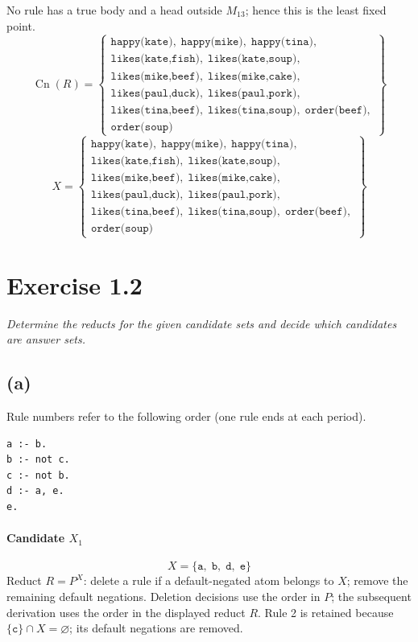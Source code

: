 \documentclass[a4paper,11pt]{article}
\newif\ifexplain
\newcommand{\explain}[1]{\ifexplain\begin{erklbox}#1\end{erklbox}\fi}
\newcommand{\angabe}[1]{\textit{#1}\par}
\newcommand{\aufgabe}[1]{\section*{Exercise #1}}
\newcommand{\teil}[1]{\subsection*{(#1)}}
\newcommand{\at}[1]{\texttt{#1}}
\begin{document}
No rule has a true body and a head outside $M_{13}$; hence this is the least fixed point.
\[
\operatorname{Cn}(R)=\left\{\begin{gathered}\at{happy(kate)},\;\at{happy(mike)},\;\at{happy(tina)},\\\at{likes(kate,fish)},\;\at{likes(kate,soup)},\\\at{likes(mike,beef)},\;\at{likes(mike,cake)},\\\at{likes(paul,duck)},\;\at{likes(paul,pork)},\\\at{likes(tina,beef)},\;\at{likes(tina,soup)},\;\at{order(beef)},\\\at{order(soup)}\end{gathered}\right\}
\]
\[
\boxed{X=\left\{\begin{gathered}\at{happy(kate)},\;\at{happy(mike)},\;\at{happy(tina)},\\\at{likes(kate,fish)},\;\at{likes(kate,soup)},\\\at{likes(mike,beef)},\;\at{likes(mike,cake)},\\\at{likes(paul,duck)},\;\at{likes(paul,pork)},\\\at{likes(tina,beef)},\;\at{likes(tina,soup)},\;\at{order(beef)},\\\at{order(soup)}\end{gathered}\right\}}
\]
\explain{Die Probe besteht aus zwei Teilen: Jede aufgenommene Aussage hat oben eine passende Regel. Am Ende kann keine Regel ein weiteres Atom hinzufügen. Damit ist die Menge ein Modell und zugleich das kleinste Modell.}
\aufgabe{1.2}
\angabe{Determine the reducts for the given candidate sets and decide which candidates are answer sets.}
\teil{a}
Rule numbers refer to the following order (one rule ends at each period).
\begin{small}
\begin{verbatim}
a :- b.
b :- not c.
c :- not b.
d :- a, e.
e.
\end{verbatim}
\end{small}
\explain{Die Regeln für $b$ und $c$ bilden eine gegenseitige Default-Negation: \texttt{b :- not c.} leitet $b$ ab, wenn $c$ fehlt; \texttt{c :- not b.} entsprechend $c$. Sie erzeugen zwei alternative Fälle. \texttt{e.} ist ein Fakt. Wenn $b$ gilt, folgt $a$ und danach $d$; wenn $c$ gilt, bleibt der positive Kreis über $a$ und $d$ ohne Start. Die Kandidaten werden danach mit dem jeweiligen Redukt geprüft.}
\paragraph{Candidate $X_1$}
\[
X=\{\at{a},\;\at{b},\;\at{d},\;\at{e}\}
\]
Reduct $R=P^X$: delete a rule if a default-negated atom belongs to $X$; remove the remaining default negations. Deletion decisions use the order in $P$; the subsequent derivation uses the order in the displayed reduct $R$.
Rule 2 is retained because $\{\at{c}\}\cap X=\varnothing$; its default negations are removed.
\end{document}
